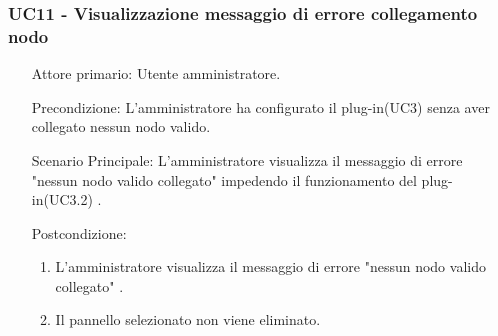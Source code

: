 \subsubsection{UC11 - Visualizzazione messaggio di errore collegamento nodo}
\label{sssec:uc11}
\begin{description}
	\begin{enumerate}
		\item[Attore primario:] Utente amministratore.
		\item[Precondizione:] L'amministratore ha configurato il plug-in(UC3) senza aver collegato nessun nodo valido.
		\item[Scenario Principale:] L'amministratore visualizza il messaggio di errore "nessun nodo valido collegato" impedendo il funzionamento del plug-in(UC3.2) .
		\item[Postcondizione:]
		\begin{enumerate}
			\item L'amministratore visualizza il messaggio di errore "nessun nodo valido collegato" .
			\item Il pannello selezionato non viene eliminato.
		\end{enumerate}
	\end{enumerate}
\end{description}